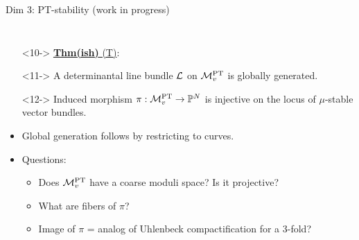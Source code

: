 \documentclass[8pt,handout]{beamer} %
\begin{document}
\begin{frame}{Dim 3: PT-stability (work in progress)}
\begin{columns}[t]
        \begin{itemize}
            \item[]<10-> \underline{\textbf{Thm(ish)} (T)}: 
                \item[]<11-> A determinantal line bundle $\mathcal{L}$ on $\mathcal{M}^{\text{PT}}_v$ is globally generated.
                \item[]<12-> Induced morphism $\pi: \mathcal{M}^{\text{PT}}_v \to \mathbb{P}^N$ is injective on the locus of $\mu$-stable vector bundles.
            \item[]
            \item<13-> Global generation follows by restricting to curves.
            \item<14-> Questions:
            \begin{itemize}
                \item<15-> Does $\mathcal{M}^{\text{PT}}_v$ have a coarse moduli space? Is it projective?
                \item<16-> What are fibers of $\pi$?
                \item<17-> Image of $\pi$ = analog of Uhlenbeck compactification for a 3-fold?
            \end{itemize}
            
        \end{itemize}
    \end{columns}
\end{frame}
\end{document}
